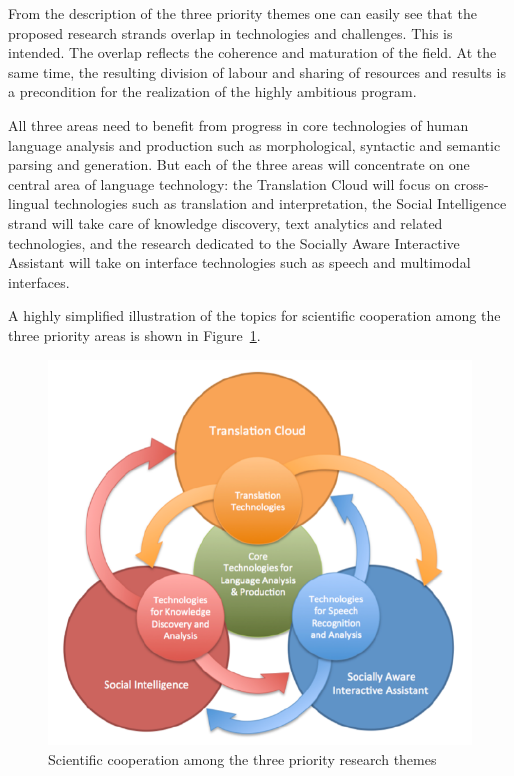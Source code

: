 \documentclass[10pt, plain]{../../metanetpaper}
\begin{document}
\begin{multicols}{2}
From the description of the three priority themes one can easily see that the proposed research strands overlap in technologies and challenges. This is intended. The overlap reflects the coherence and maturation of the field. At the same time, the resulting division of labour and sharing of resources and results is a precondition for the realization of the highly ambitious program.
 
All three areas need to benefit from progress in core technologies of human language analysis and production such as morphological, syntactic and semantic parsing and generation. But each of the three areas will concentrate on one central area of language technology: the Translation Cloud will focus on cross-lingual technologies such as translation and interpretation, the Social Intelligence strand will take care of knowledge discovery, text analytics and related technologies, and the research dedicated to the Socially Aware Interactive Assistant will take on interface technologies such as speech and multimodal interfaces.
 
A highly simplified illustration of the topics for scientific cooperation among the three priority areas is shown in Figure~\ref{fig:priority-themes}.

\begin{figure}[htb]
  \center
  \includegraphics[width=\textwidth]{images/PT-Rings}
  \caption{Scientific cooperation among the three priority research themes}
  \label{fig:priority-themes}
\end{figure}


\end{multicols}
\end{document}
